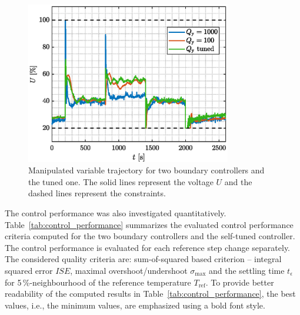 \documentclass[preprint,12pt]{elsarticle}
\begin{document}
\begin{figure}
	\begin{center}
		\includegraphics[width=0.8\textwidth]{images/MV}
		\caption{Manipulated variable trajectory for two boundary controllers and the tuned one. The solid lines represent the voltage $U$ and the dashed lines represent the constraints.}
		\label{fig:MV}
	\end{center}
\end{figure}

The control performance was also investigated quantitatively. Table~\ref{tab:control_performance} summarizes the evaluated control performance criteria computed for the two boundary controllers and the self-tuned controller. The control performance is evaluated for each reference step change separately. The considered quality criteria are: sum-of-squared based criterion -- integral squared error $ISE$, maximal overshoot/undershoot $\sigma_{\mathrm{max}}$ and the settling time $t_{\epsilon}$ for 5\,\%-neighbourhood of the reference temperature $T_{\mathrm{ref}}$. To provide better readability of the computed results in Table~\ref{tab:control_performance}, the best values, i.e., the minimum values, are emphasized using a bold font style. 
\end{document}
